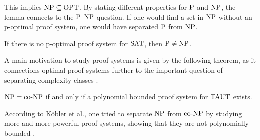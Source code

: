   This implies \(\NP \subseteq \OPT\). By stating different properties for \(\P\) and \(\NP\), the lemma connects to the \(\P\)-\(\NP\)-question. If one would find a set in \(\NP\) without an p-optimal proof system, one would have separated \(\P\) from \(\NP\).

  \begin{corollary}
    If there is no p-optimal proof system for \(\SAT\), then \(\P \neq \NP\).
  \end{corollary}  
  
  A main motivation to study proof systems is given by the following theorem, as it connections optimal proof systems further to the important question of separating complexity classes \cite{KMT03}.

  \begin{theorem}
   \(\NP = \coNP\) if and only if a polynomial bounded proof system for \(\TAUT\) exists.
  \end{theorem}

  According to Köbler et al., one tried to separate \(\NP\) from \(\coNP\) by studying more and more powerful proof systems, showing that they are not polynomially bounded \cite{KMT03}. 





  